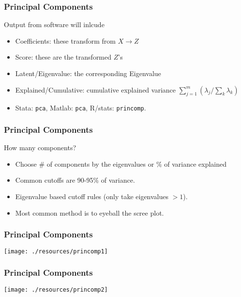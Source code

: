 \documentclass[xcolor=pdftex,dvipsnames,table,mathserif,aspectratio=169]{beamer}
\begin{document}
\begin{frame}
\frametitle{Principal Components}
Output from software will inlcude
\begin{itemize}
\item Coefficients: these transform from $X\rightarrow Z$
\item Score: these are the transformed $Z$'s
\item Latent/Eigenvalue: the corresponding Eigenvalue
\item Explained/Cumulative: cumulative explained variance $ \sum_{j=1}^m( \lambda_j / \sum_k \lambda_k)$
\item Stata: \texttt{pca}, Matlab: \texttt{pca}, R/stats: \texttt{princomp}.
\end{itemize}
\end{frame}

\begin{frame}
\frametitle{Principal Components}
How many components?
\begin{itemize}
\item Choose \# of components by the eigenvalues or \% of variance explained
\item Common cutoffs are 90-95\% of variance.
\item Eigenvalue based cutoff rules (only take eigenvalues $ > 1$).
\item Most common method is to eyeball the scree plot.
\end{itemize}
\end{frame}


\begin{frame}
\frametitle{Principal Components}
\begin{center}
\texttt{[image: ./resources/princomp1]}
\end{center}
\end{frame}

\begin{frame}
\frametitle{Principal Components}
\begin{center}
\texttt{[image: ./resources/princomp2]}
\end{center}
\end{frame}
\end{document}
